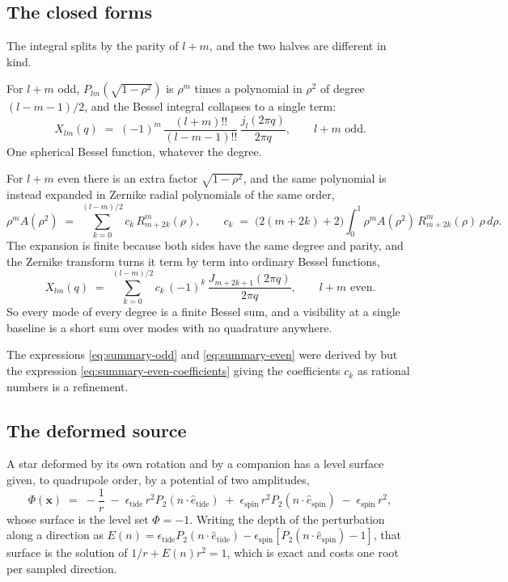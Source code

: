 \subsection{The closed forms}

The integral splits by the parity of $l+m$, and the two halves are different in kind.

For $l+m$ odd, $P_{lm}(\sqrt{1-\rho^2})$ is $\rho^m$ times a polynomial in $\rho^2$ of degree
$(l-m-1)/2$, and the Bessel integral collapses to a single term:
\begin{equation}
  X_{lm}(q) \;=\; (-1)^m\,\frac{(l+m)!!}{(l-m-1)!!}\,
  \frac{j_l(2\pi q)}{2\pi q} , \qquad l+m \text{ odd} .
  \label{eq:summary-odd}
\end{equation}
One spherical Bessel function, whatever the degree.

For $l+m$ even there is an extra factor $\sqrt{1-\rho^2}$, and the same polynomial is instead
expanded in Zernike radial polynomials of the same order,
\begin{equation}
  \rho^m A(\rho^2) \;=\; \sum_{k=0}^{(l-m)/2} c_k\, R_{m+2k}^{m}(\rho) ,
  \qquad
  c_k \;=\; \bigl(2(m+2k)+2\bigr)\int_0^1 \rho^m A(\rho^2)\,R_{m+2k}^{m}(\rho)\,
  \rho\, d\rho .
  \label{eq:summary-even-coefficients}
\end{equation}
The expansion is finite because both sides have the same degree and parity, and the Zernike
transform turns it term by term into ordinary Bessel functions,
\begin{equation}
  X_{lm}(q) \;=\; \sum_{k=0}^{(l-m)/2} c_k\,(-1)^k\,
  \frac{J_{m+2k+1}(2\pi q)}{2\pi q} , \qquad l+m \text{ even} .
  \label{eq:summary-even}
\end{equation}
So every mode of every degree is a finite Bessel sum, and a visibility at a single baseline
is a short sum over modes with no quadrature anywhere.

The expressions \eqref{eq:summary-odd} and \eqref{eq:summary-even}
were derived by \cite{dholakia2025} but the
expression \eqref{eq:summary-even-coefficients} giving the
coefficients $c_k$ as rational numbers is a refinement.

\subsection{The deformed source}

A star deformed by its own rotation and by a companion has a level
surface given, to quadrupole order, by a potential of two amplitudes,
\begin{equation}
  \Phi(\mathbf{x}) \;=\; -\frac{1}{r}
  \;-\;\epsilon_\text{tide}\,r^2P_2(n\cdot\hat e_\text{tide})
  \;+\;\epsilon_\text{spin}\,r^2P_2(n\cdot\hat e_\text{spin})
  \;-\;\epsilon_\text{spin}\,r^2 ,
  \label{eq:summary-potential}
\end{equation}
whose surface is the level set $\Phi = -1$.  Writing the depth of the perturbation along a
direction as $E(n) = \epsilon_\text{tide}P_2(n\cdot\hat e_\text{tide})
- \epsilon_\text{spin}[P_2(n\cdot\hat e_\text{spin})-1]$, that surface is the solution of
$1/r + E(n)r^2 = 1$, which is exact and costs one root per sampled direction.

